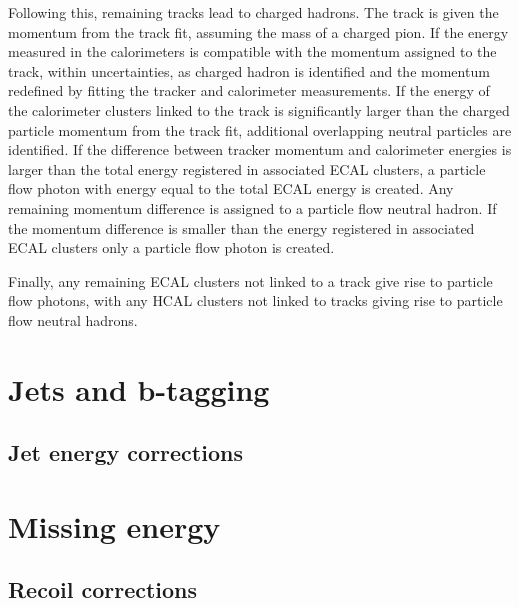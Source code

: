 Following this, remaining tracks lead to charged hadrons. The track is
given the momentum from the track fit, assuming the mass of a charged pion. If
the energy measured in the calorimeters is compatible with the momentum assigned
to the track, within uncertainties, as charged hadron is identified and the
momentum redefined by fitting the tracker and calorimeter measurements. If
the energy of the calorimeter clusters linked to the track is significantly larger than the
charged particle momentum from the track fit, additional overlapping neutral particles
are identified. If the difference between tracker momentum and calorimeter
energies is larger than the total energy registered in associated \ac{ECAL} clusters,
a particle flow photon with energy equal to the total \ac{ECAL} energy is created.
Any remaining momentum difference is assigned to a particle flow neutral hadron. If the momentum
difference is smaller than the energy registered in associated \ac{ECAL} clusters 
only a particle flow photon is created. %

Finally, any remaining \ac{ECAL} clusters not linked to a track give
rise to particle flow photons, with any \ac{HCAL} clusters
not linked to tracks giving rise to particle flow neutral hadrons.



\section{Jets and b-tagging}
\label{sec:objects_jets}

\subsection{Jet energy corrections}
\label{sec:objects_jets_jec}

\section{Missing energy}
\label{sec:objects_met}

\subsection{Recoil corrections}
\label{sec:objects_met_recoilcorr}

